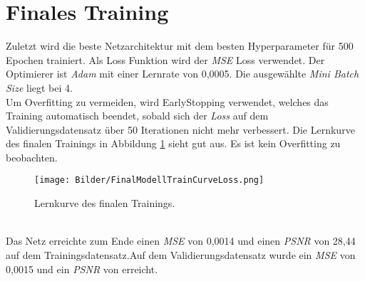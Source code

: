 \documentclass[conference]{IEEEtran}
\begin{document}
\section{Finales Training}
Zuletzt wird die beste Netzarchitektur mit dem besten Hyperparameter für 500 Epochen trainiert. Als Loss Funktion wird der \textit{MSE} Loss verwendet. Der Optimierer ist \textit{Adam} mit einer Lernrate von 0,0005. Die ausgewählte \textit{Mini Batch Size} liegt bei 4.\\ Um Overfitting zu vermeiden, wird EarlyStopping verwendet, welches das Training automatisch beendet, sobald sich der \textit{Loss} auf dem Validierungsdatensatz über 50 Iterationen nicht mehr verbessert. Die Lernkurve des finalen Trainings in Abbildung \ref{curve} sieht gut aus. Es ist kein Overfitting zu beobachten.
\begin{figure}[h]
	\begin{center}
		\texttt{[image: Bilder/FinalModellTrainCurveLoss.png]}
		\caption{Lernkurve des finalen Trainings.}
		\label{curve}
	\end{center}
\end{figure}\\
Das Netz erreichte zum Ende einen \textit{MSE} von 0,0014 und einen \textit{PSNR} von 28,44 auf dem Trainingsdatensatz.Auf dem Validierungsdatensatz wurde ein  \textit{MSE} von 0,0015 und ein \textit{PSNR} von erreicht.
\end{document}
